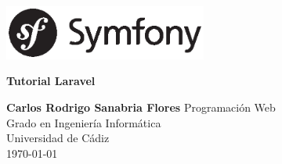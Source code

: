 \begin{titlepage}
    \includegraphics[width=0.5\textwidth]{../assets/symfony_logo.eps}
    \begin{center}
        \vspace*{6cm}

        \textbf{\LARGE{Tutorial Laravel}}

        \vspace{0.5cm}
        \textbf{\LARGE{Carlos Rodrigo Sanabria Flores}}
        \vspace{2cm}
        \vfill
        Programación Web\\
        Grado en Ingeniería Informática\\
        Universidad de Cádiz\\
        \today
        \vspace{2cm}

    \end{center}
\end{titlepage}